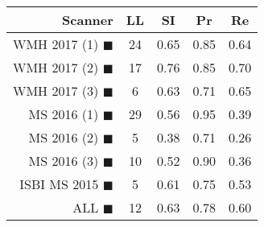 \begin{tabular}{rcccc}
\toprule
Scanner & LL & SI & Pr & Re \\
\midrule
WMH 2017 (1) {\color[rgb]{ 1.00 0.00 0.00}$\blacksquare$} & 24 & 0.65 & 0.85 & 0.64 \\
WMH 2017 (2) {\color[rgb]{ 1.00 0.50 0.00}$\blacksquare$} & 17 & 0.76 & 0.85 & 0.70 \\
WMH 2017 (3) {\color[rgb]{ 1.00 0.80 0.00}$\blacksquare$} & 6 & 0.63 & 0.71 & 0.65 \\
MS  2016 (1) {\color[rgb]{ 0.20 0.80 0.00}$\blacksquare$} & 29 & 0.56 & 0.95 & 0.39 \\
MS  2016 (2) {\color[rgb]{ 0.00 0.40 1.00}$\blacksquare$} & 5 & 0.38 & 0.71 & 0.26 \\
MS  2016 (3) {\color[rgb]{ 0.60 0.00 1.00}$\blacksquare$} & 10 & 0.52 & 0.90 & 0.36 \\
ISBI MS 2015 {\color[rgb]{ 1.00 0.00 1.00}$\blacksquare$} & 5 & 0.61 & 0.75 & 0.53 \\
\midrule
ALL {\color[rgb]{ 1.00 1.00 1.00}$\blacksquare$} & 12 & 0.63 & 0.78 & 0.60 \\
\bottomrule
\end{tabular}